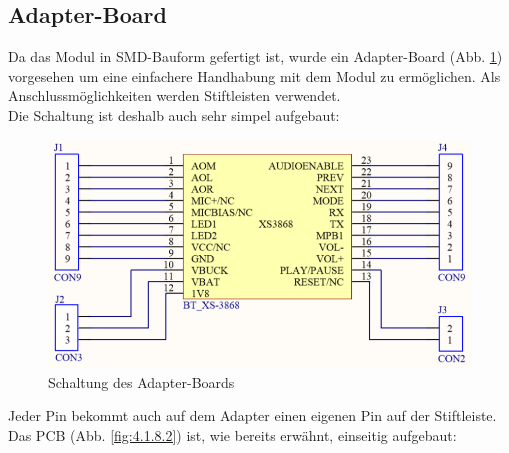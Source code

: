 

\subsection{Adapter-Board} \label{subsec:4.1.8}
Da das Modul in SMD-Bauform gefertigt ist, wurde ein Adapter-Board (Abb. \ref{fig:4.1.8.1}) vorgesehen um eine einfachere Handhabung mit dem Modul zu ermöglichen. Als Anschlussmöglichkeiten werden Stiftleisten verwendet.\\
Die Schaltung ist deshalb auch sehr simpel aufgebaut:
\begin{figure} [H]
	\centering
	\includegraphics[width=1\textwidth]{img/BTModul/adapter_sch.png}
	\caption{Schaltung des Adapter-Boards}\label {fig:4.1.8.1}
\end{figure} 
Jeder Pin bekommt auch auf dem Adapter einen eigenen Pin auf der Stiftleiste.
\newpage
Das PCB (Abb. \ref{fig:4.1.8.2}) ist, wie bereits erwähnt, einseitig aufgebaut:

